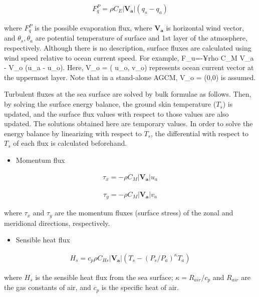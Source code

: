 \begin{eqnarray}
    F_q^P =  \rho C_E |\mathbf{V_a}| ( q_s - q_a )
\end{eqnarray}

where \(F_q^P\) is the possible evaporation flux, where \(\mathbf{V_a}\) is horizontal wind vector, and \(\theta_s, \theta_a\) are potential temperature of surface and 1st layer of the atmosphere,
respectively. Although there is no description, surface fluxes are calculated using wind speed relative to ocean current speed. For example, F\_u=-¥rho C\_M \textbar{} V\_a - V\_o \textbar{} (u\_a -
u\_o). Here, V\_o = ( u\_o, v\_o) represents ocean current vector at the uppermost layer. Note that in a stand-alone AGCM, V\_o = (0,0) is assumed.

Turbulent fluxes at the sea surface are solved by bulk formulae as follows. Then, by solving the surface energy balance, the ground skin temperature (\(T_s\)) is updated, and the surface flux values
with respect to those values are also updated. The solutions obtained here are temporary values. In order to solve the energy balance by linearizing with respect to \(T_s\), the differential with
respect to \(T_s\) of each flux is calculated beforehand.

\begin{itemize}
\tightlist
\item
  Momentum flux
\end{itemize}

\begin{eqnarray}
 \tau_x = - \rho C_{M}|\mathbf{V_a}| u_a
\end{eqnarray}

\begin{eqnarray}
 \tau_y = - \rho C_{M}|\mathbf{V_a}| v_a
\end{eqnarray}

where \(\tau_x\) and \(\tau_y\) are the momentum fluxes (surface stress) of the zonal and meridional directions, respectively.

\begin{itemize}
\tightlist
\item
  Sensible heat flux
\end{itemize}

\begin{eqnarray}
 H_s = c_p \rho C_{Hs}|\mathbf{V_a}| (T_s - (P_s/P_a)^{\kappa}T_a)
\end{eqnarray}

where \(H_s\) is the sensible heat flux from the sea surface; \(\kappa = R_{air} / c_p\) and \(R_{air}\) are the gas constants of air, and \(c_p\) is the specific heat of air.

